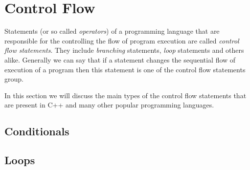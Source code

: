 \documentclass[../sparc.tex]{subfiles}
\begin{document}
\section{Control Flow}

Statements (or so called \emph{operators}) of a programming language that are
responsible for the controlling the flow of program execution are called
\emph{control flow statements}.  They include \emph{branching} statements,
\emph{loop} statements and others alike.  Generally we can say that if a
statement changes the sequential flow of execution of a program then this
statement is one of the control flow statements group.

In this section we will discuss the main types of the control flow statements
that are present in C++ and many other popular programming languages.

\subsection{Conditionals}

\subsection{Loops}
\end{document}
